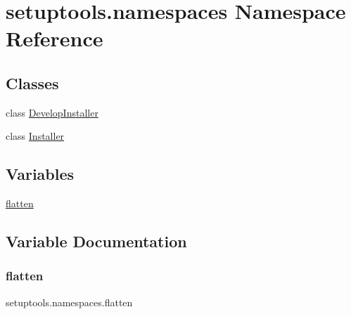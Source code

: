 \hypertarget{namespacesetuptools_1_1namespaces}{}\section{setuptools.\+namespaces Namespace Reference}
\label{namespacesetuptools_1_1namespaces}
\subsection*{Classes}
\begin{DoxyCompactItemize}
\item 
class \hyperlink{classsetuptools_1_1namespaces_1_1_develop_installer}{Develop\+Installer}
\item 
class \hyperlink{classsetuptools_1_1namespaces_1_1_installer}{Installer}
\end{DoxyCompactItemize}
\subsection*{Variables}
\begin{DoxyCompactItemize}
\item 
\hyperlink{namespacesetuptools_1_1namespaces_ac526d0a5bfb5f02e06baaacd8ea73a8a}{flatten}
\end{DoxyCompactItemize}


\subsection{Variable Documentation}
\mbox{\label{namespacesetuptools_1_1namespaces_ac526d0a5bfb5f02e06baaacd8ea73a8a}} 
\subsubsection{\texorpdfstring{flatten}{flatten}}
{\footnotesize\ttfamily setuptools.\+namespaces.\+flatten}

